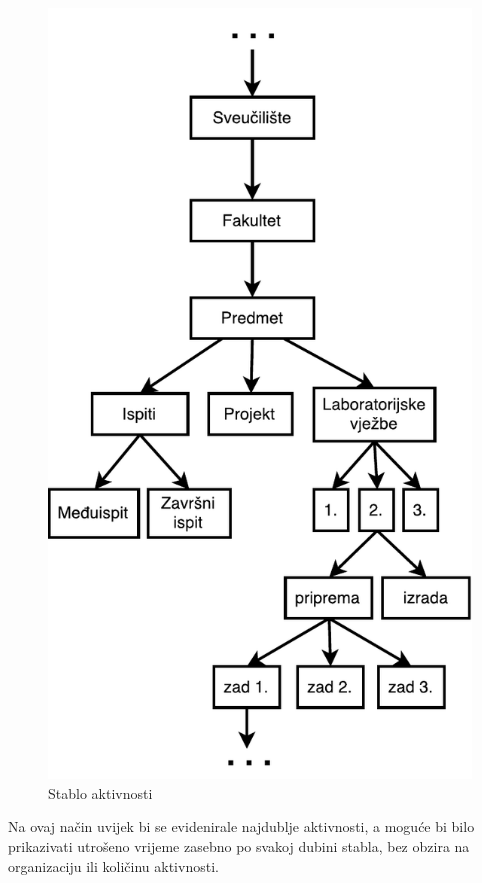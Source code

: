 \documentclass[times, utf8, zavrsni]{fer}
\begin{document}
\begin{enumerate}[leftmargin=*]
\begin{figure}[H]
\centering
\includegraphics[scale=0.6]{img/stablo-aktivnosti.pdf}
\caption{Stablo aktivnosti}
\label{fig:stablo-aktivnosti}
\end{figure}

Na ovaj način uvijek bi se evidenirale najdublje aktivnosti, a moguće bi bilo prikazivati utrošeno vrijeme zasebno po svakoj dubini stabla, bez obzira na organizaciju ili količinu aktivnosti.
\end{enumerate}
\end{document}
